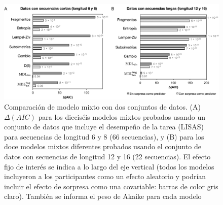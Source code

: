 \begin{figure}[t!]
   \includegraphics[scale=0.8]{figuras/plosbio/journal.pcbi.1008598.g010_SP.PNG}
   
   \centering
   
   \caption{Comparación de modelo mixto con dos conjuntos de datos. (A) $\Delta(AIC)$ para los dieciséis modelos mixtos probados usando un conjunto de datos que incluye el desempeño de la tarea (LISAS) para secuencias de longitud 6 y 8 (66 secuencias), y (B) para los doce modelos mixtos diferentes probados usando el conjunto de datos con secuencias de longitud 12 y 16 (22 secuencias). El efecto fijo de interés se indica a lo largo del eje vertical (todos los modelos incluyeron a los participantes como un efecto aleatorio y podrían incluir el efecto de sorpresa como una covariable: barras de color gris claro). También se informa el peso de Akaike para cada modelo}
   \label{PlosBIO-F10}
\end{figure}

